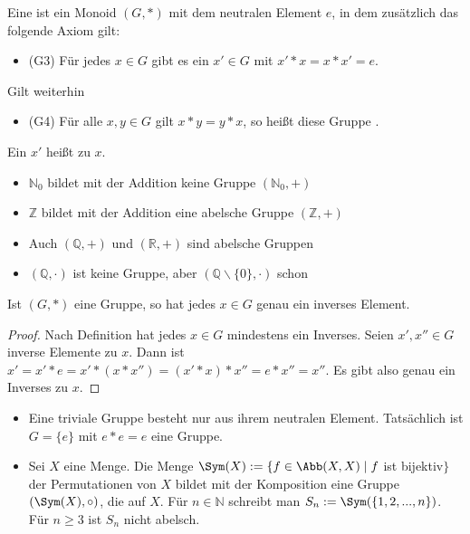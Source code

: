 \begin{definition}
	Eine  ist ein Monoid $(G,*)$ mit dem neutralen Element
	$e$, in dem zusätzlich das folgende Axiom gilt:
	\begin{itemize}
		\item (G3) Für jedes $x \in G$ gibt es ein $x' \in G$ mit $x'*x=x*x'=e$.
	\end{itemize}
	Gilt weiterhin
	\begin{itemize}
		\item (G4) Für alle $x,y \in G$ gilt $x*y=y*x$, so heißt diese Gruppe .
	\end{itemize}
\end{definition}

Ein $x'$ heißt  zu $x$. \\

\begin{example}
	\begin{itemize}
		\item $\mathbb N_0$ bildet mit der Addition keine Gruppe $(\mathbb N_0,+)$
		\item $\mathbb Z$ bildet mit der Addition eine abelsche Gruppe $(\mathbb Z,+)$
		\item Auch $(\mathbb Q,+)$ und $(\mathbb R,+)$ sind abelsche Gruppen
		\item $(\mathbb Q,\cdot)$ ist keine Gruppe, aber $(\mathbb Q\backslash\{0\},\cdot)$ schon
	\end{itemize}
\end{example}

\begin{proposition}
	Ist $(G,*)$ eine Gruppe, so hat jedes $x \in G$ genau ein inverses Element.
\end{proposition}
\begin{proof}
	Nach Definition hat jedes $x\in G$ mindestens ein Inverses. Seien $x',x''\in G$ inverse Elemente zu $x$. Dann ist 
	$x'=x'*e=x'*(x*x'')=(x'*x)*x''=e*x''=x''$. Es gibt also genau ein Inverses zu $x$.
\end{proof}

\begin{example}
	\begin{itemize}
		\item Eine triviale Gruppe besteht nur aus ihrem neutralen Element. Tatsächlich ist $G=\{e\}$ mit
		$e*e=e$ eine Gruppe.
		\item Sei $X$ eine Menge. Die Menge $\Sym(X) := \{f \in \Abb(X,X) \mid f$ ist bijektiv$\}$ der
		Permutationen von $X$ bildet mit der Komposition eine Gruppe $(\Sym(X),\circ)$, die 
		 auf $X$. Für $n \in \mathbb N$ schreibt man $S_n := \Sym(\{1,2,...,n\})$. 
		Für $n \ge 3$ ist $S_n$ nicht abelsch.
	\end{itemize}
\end{example}

